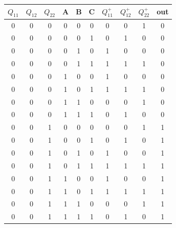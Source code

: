 \documentclass[fleqn]{article}
\begin{document}
\begin{latin}
	\begin{center}
		\begin{longtable}{|ccc|ccc||ccc|c|}
			\hline
			$Q_{11}$ & $Q_{12}$ & $Q_{22}$ & A & B & C & $Q_{11}^+$ & $Q_{12}^+$ & $Q_{22}^+$ & out \\ \hline \hline
			0        & 0        & 0        & 0 & 0 & 0 & 0          & 0          & 1          & 0   \\ \hline
			0        & 0        & 0        & 0 & 0 & 1 & 0          & 1          & 0          & 0   \\ \hline
			0        & 0        & 0        & 0 & 1 & 0 & 1          & 0          & 0          & 0   \\ \hline
			0        & 0        & 0        & 0 & 1 & 1 & 1          & 1          & 1          & 0   \\ \hline
			0        & 0        & 0        & 1 & 0 & 0 & 1          & 0          & 0          & 0   \\ \hline
			0        & 0        & 0        & 1 & 0 & 1 & 1          & 1          & 1          & 0   \\ \hline
			0        & 0        & 0        & 1 & 1 & 0 & 0          & 0          & 1          & 0   \\ \hline
			0        & 0        & 0        & 1 & 1 & 1 & 0          & 1          & 0          & 0   \\ \hline
			0        & 0        & 1        & 0 & 0 & 0 & 0          & 0          & 1          & 1   \\ \hline
			0        & 0        & 1        & 0 & 0 & 1 & 0          & 1          & 0          & 1   \\ \hline
			0        & 0        & 1        & 0 & 1 & 0 & 1          & 0          & 0          & 1   \\ \hline
			0        & 0        & 1        & 0 & 1 & 1 & 1          & 1          & 1          & 1   \\ \hline
			0        & 0        & 1        & 1 & 0 & 0 & 1          & 0          & 0          & 1   \\ \hline
			0        & 0        & 1        & 1 & 0 & 1 & 1          & 1          & 1          & 1   \\ \hline
			0        & 0        & 1        & 1 & 1 & 0 & 0          & 0          & 1          & 1   \\ \hline
			0        & 0        & 1        & 1 & 1 & 1 & 0          & 1          & 0          & 1   \\ \hline

\end{longtable}
\end{center}
\end{latin}
\end{document}
